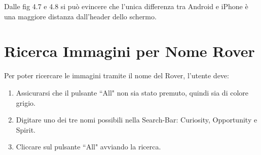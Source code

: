 Dalle fig 4.7 e 4.8 si pu\`o evincere che l'unica differenza tra Android e iPhone \`e una maggiore distanza dall'header dello schermo.
\section*{Ricerca Immagini per Nome Rover}
Per poter ricercare le immagini tramite il nome del Rover, l'utente deve:

\begin{enumerate}
    \item Assicurarsi che il pulsante ``All" non sia stato premuto, quindi sia di colore grigio.
    \item Digitare uno dei tre nomi possibili nella Search-Bar: Curiosity, Opportunity e Spirit.
    \item Cliccare sul pulsante ``All" avviando la ricerca.
\end{enumerate}

